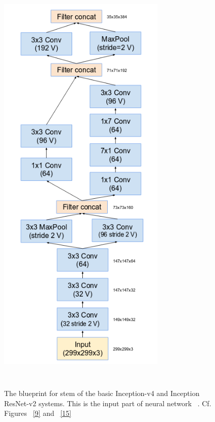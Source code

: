 \documentclass[a4paper,12pt, twoside]{NITKReport}
\begin{document}
\begin{figure}[h]
  \centering
    
    \includegraphics[height=21cm, width=8cm]{figure3.png}
    \caption{The blueprint for stem of the basic Inception-v4 and 
Inception ResNet-v2 systems. This is the input part of neural network ~\cite{szegedy2017inception}. Cf. Figures ~\ref{9} and ~\ref{15}}
    \label{3}
  
\end{figure}
\end{document}
